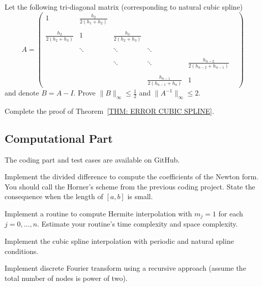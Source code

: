 \begin{problem}
    Let the following tri-diagonal matrix (corresponding to natural cubic spline)
    $$A = \begin{pmatrix}
        1 & \frac{h_{2}}{2(h_1 + h_{2})} & \\\\
        \frac{h_2}{2(h_2 + h_{3})} & 1 & \frac{h_{3}}{2(h_2 + h_{3})} & \\\\
        &\ddots &\ddots &  \ddots & \\ \\
        &&\ddots &\ddots &  \frac{h_{n-2}}{2(h_{n-2} + h_{n-1})} & \\ \\
        &&& \frac{h_{n-1}}{2(h_{n-1} + h_{n})} & 1&
    \end{pmatrix} $$
    and denote $B = A - I$. Prove $\|B\|_{\infty} \le \frac{1}{2}$ and $\|A^{-1}\|_{\infty}\le 2$. 
\end{problem}


\begin{problem}[$\ast$]
    Complete the proof of Theorem~\ref{THM: ERROR CUBIC SPLINE}.
\end{problem}
\subsection{Computational Part}
The coding part and test cases are available on GitHub. 
\begin{problem}
    Implement the divided difference to compute the coefficients of the Newton form. You should call the Horner's scheme from the previous coding project. State the consequence when the length of $[a, b]$ is small. 
\end{problem}
\begin{problem}
    Implement a routine to compute Hermite interpolation with $m_j = 1$ for each $j = 0, \dots, n$. Estimate your routine's time complexity and space complexity. 
\end{problem}
\begin{problem}
    Implement the cubic spline interpolation with periodic and natural spline conditions. 
\end{problem}

\begin{problem}[$\ast$]
     Implement discrete Fourier transform using a recursive approach (assume the total number of nodes is power of two).
\end{problem}

% 
\nocite{jackson1912approximation, jackson1913accuracy, erdHos1964problems,erdos1958problems}


